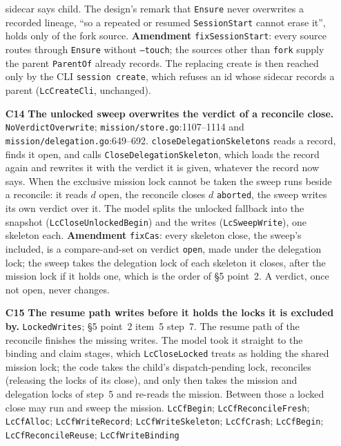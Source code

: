 \documentclass[a4paper,10pt,fleqn]{article}
\newcommand{\fpath}[1]{\texttt{#1}}
\newcommand{\field}[1]{\texttt{#1}}
\begin{document}
\begin{enumerate}
    sidecar says child. The design's remark that \field{Ensure} never
    overwrites a recorded lineage, ``so a repeated or resumed
    \field{SessionStart} cannot erase it'', holds only of the fork source.
    \textbf{Amendment} \field{fixSessionStart}: every source routes through
    \field{Ensure} without \field{--touch}; the sources other than
    \field{fork} supply the parent \field{ParentOf} already records. The
    replacing create is then reached only by the CLI \field{session create},
    which refuses an id whose sidecar records a parent (\field{LcCreateCli},
    unchanged).
  \item[\textbf{C14}] \textbf{The unlocked sweep overwrites the verdict of a
    reconcile close.} \field{NoVerdictOverwrite}; \fpath{mission/store.go}:1107--1114
    and \fpath{mission/delegation.go}:649--692. \field{closeDelegationSkeletons}
    reads a record, finds it open, and calls \field{CloseDelegationSkeleton},
    which loads the record again and rewrites it with the verdict it is
    given, whatever the record now says. When the exclusive mission lock
    cannot be taken the sweep runs beside a reconcile: it reads $d$ open, the
    reconcile closes $d$ \field{aborted}, the sweep writes its own verdict over
    it. The model splits the unlocked fallback into the snapshot
    (\field{LcCloseUnlockedBegin}) and the writes (\field{LcSweepWrite}), one
    skeleton each. \textbf{Amendment} \field{fixCas}: every skeleton close,
    the sweep's included, is a compare-and-set on verdict \field{open}, made
    under the delegation lock; the sweep takes the delegation lock of each
    skeleton it closes, after the mission lock if it holds one, which is the
    order of \S5 point~2. A verdict, once not open, never changes.
  \item[\textbf{C15}] \textbf{The resume path writes before it holds the locks
    it is excluded by.} \field{LockedWrites}; \S5 point~2 item~5 step~7. The
    resume path of the reconcile finishes the missing writes. The model took
    it straight to the binding and claim stages, which \field{LcCloseLocked}
    treats as holding the shared mission lock; the code takes the child's
    dispatch-pending lock, reconciles (releasing the locks of its close), and
    only then takes the mission and delegation locks of step~5 and re-reads
    the mission. Between those a locked close may run and sweep the mission.
    \field{LcCfBegin}; \field{LcCfReconcileFresh}; \field{LcCfAlloc};
    \field{LcCfWriteRecord}; \field{LcCfWriteSkeleton}; \field{LcCfCrash};
    \field{LcCfBegin}; \field{LcCfReconcileReuse}; \field{LcCfWriteBinding}

\end{enumerate}
\end{document}
